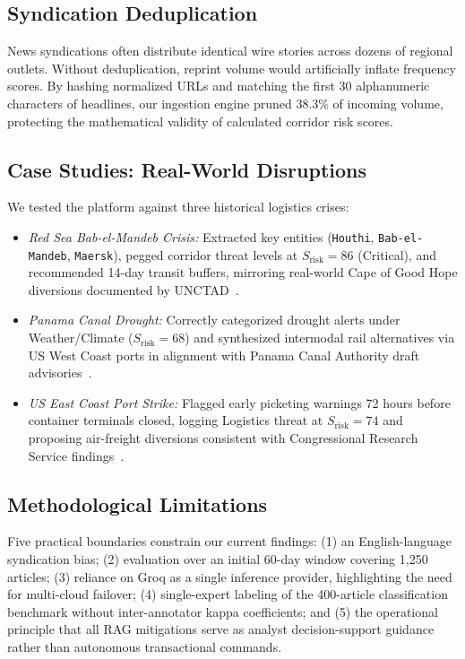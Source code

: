 \documentclass[conference]{IEEEtran}
\begin{document}
\subsection{Syndication Deduplication}
News syndications often distribute identical wire stories across dozens of regional outlets. Without deduplication, reprint volume would artificially inflate frequency scores. By hashing normalized URLs and matching the first 30 alphanumeric characters of headlines, our ingestion engine pruned 38.3\% of incoming volume, protecting the mathematical validity of calculated corridor risk scores.

\subsection{Case Studies: Real-World Disruptions}
We tested the platform against three historical logistics crises:
\begin{itemize}
    \item \textit{Red Sea Bab-el-Mandeb Crisis:} Extracted key entities (\texttt{Houthi}, \texttt{Bab-el-Mandeb}, \texttt{Maersk}), pegged corridor threat levels at $S_{\text{risk}} = 86$ (Critical), and recommended 14-day transit buffers, mirroring real-world Cape of Good Hope diversions documented by UNCTAD~\cite{unctad2024troubled}.
    \item \textit{Panama Canal Drought:} Correctly categorized drought alerts under Weather/Climate ($S_{\text{risk}} = 68$) and synthesized intermodal rail alternatives via US West Coast ports in alignment with Panama Canal Authority draft advisories~\cite{acp2023panama}.
    \item \textit{US East Coast Port Strike:} Flagged early picketing warnings 72 hours before container terminals closed, logging Logistics threat at $S_{\text{risk}} = 74$ and proposing air-freight diversions consistent with Congressional Research Service findings~\cite{crs2024portstrike}.
\end{itemize}

\subsection{Methodological Limitations}
\label{subsec:limitations}
Five practical boundaries constrain our current findings: (1) an English-language syndication bias; (2) evaluation over an initial 60-day window covering 1,250 articles; (3) reliance on Groq as a single inference provider, highlighting the need for multi-cloud failover; (4) single-expert labeling of the 400-article classification benchmark without inter-annotator kappa coefficients; and (5) the operational principle that all RAG mitigations serve as analyst decision-support guidance rather than autonomous transactional commands.
\end{document}

